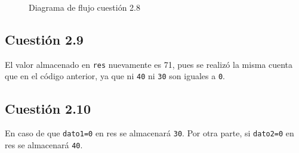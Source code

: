 \documentclass[11pt]{article}
\begin{document}
\begin{large}
\begin{flushleft}
\begin{figure}[H]
    \centering
    \caption{Diagrama de flujo cuestión 2.8}
    \label{fig:my_label}
\end{figure}

\subsection*{Cuestión 2.9}
El valor almacenado en \texttt{res} nuevamente es 71, pues se realizó la misma cuenta que en el código anterior, ya que ni \texttt{40} ni \texttt{30} son iguales a \texttt{0}.

\subsection*{Cuestión 2.10}
En caso de que \texttt{dato1=0} en res se almacenará \texttt{30}. Por otra parte, si \texttt{dato2=0} en res se almacenará \texttt{40}.



\end{flushleft}
\end{large}
\end{document}
